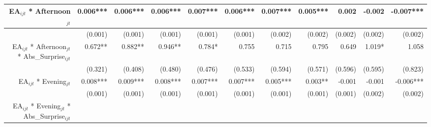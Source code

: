 \begin{table}
{\begin{tabular}{rrrrrrrrrrr}
\multicolumn{1}{|r|}{EA$_{ijt}$ * Afternoon$_{jt}$} &
  \multicolumn{1}{r|}{0.006***} &
  \multicolumn{1}{r|}{0.006***} &
  \multicolumn{1}{r|}{0.006***} &
  \multicolumn{1}{r|}{0.007***} &
  \multicolumn{1}{r|}{0.006***} &
  \multicolumn{1}{r|}{0.007***} &
  \multicolumn{1}{r|}{0.005***} &
  \multicolumn{1}{r|}{0.002} &
  \multicolumn{1}{r|}{-0.002} &
  \multicolumn{1}{r|}{-0.007***} \\ \hline
\multicolumn{1}{|r|}{} &
  \multicolumn{1}{r|}{(0.001)} &
  \multicolumn{1}{r|}{(0.001)} &
  \multicolumn{1}{r|}{(0.001)} &
  \multicolumn{1}{r|}{(0.001)} &
  \multicolumn{1}{r|}{(0.001)} &
  \multicolumn{1}{r|}{(0.002)} &
  \multicolumn{1}{r|}{(0.002)} &
  \multicolumn{1}{r|}{(0.002)} &
  \multicolumn{1}{r|}{(0.002)} &
  \multicolumn{1}{r|}{(0.002)} \\ \hline
\multicolumn{1}{|r|}{EA$_{ijt}$ * Afternoon$_{jt}$ * Abs\_Surprise$_{ijt}$} &
  \multicolumn{1}{r|}{0.672**} &
  \multicolumn{1}{r|}{0.882**} &
  \multicolumn{1}{r|}{0.946**} &
  \multicolumn{1}{r|}{0.784*} &
  \multicolumn{1}{r|}{0.755} &
  \multicolumn{1}{r|}{0.715} &
  \multicolumn{1}{r|}{0.795} &
  \multicolumn{1}{r|}{0.649} &
  \multicolumn{1}{r|}{1.019*} &
  \multicolumn{1}{r|}{1.058} \\ \hline
\multicolumn{1}{|r|}{} &
  \multicolumn{1}{r|}{(0.321)} &
  \multicolumn{1}{r|}{(0.408)} &
  \multicolumn{1}{r|}{(0.480)} &
  \multicolumn{1}{r|}{(0.476)} &
  \multicolumn{1}{r|}{(0.533)} &
  \multicolumn{1}{r|}{(0.594)} &
  \multicolumn{1}{r|}{(0.571)} &
  \multicolumn{1}{r|}{(0.596)} &
  \multicolumn{1}{r|}{(0.595)} &
  \multicolumn{1}{r|}{(0.823)} \\ \hline
\multicolumn{1}{|r|}{EA$_{ijt}$ * Evening$_{jt}$} &
  \multicolumn{1}{r|}{0.008***} &
  \multicolumn{1}{r|}{0.009***} &
  \multicolumn{1}{r|}{0.008***} &
  \multicolumn{1}{r|}{0.007***} &
  \multicolumn{1}{r|}{0.007***} &
  \multicolumn{1}{r|}{0.005***} &
  \multicolumn{1}{r|}{0.003**} &
  \multicolumn{1}{r|}{-0.001} &
  \multicolumn{1}{r|}{-0.001} &
  \multicolumn{1}{r|}{-0.006***} \\ \hline
\multicolumn{1}{|r|}{} &
  \multicolumn{1}{r|}{(0.001)} &
  \multicolumn{1}{r|}{(0.001)} &
  \multicolumn{1}{r|}{(0.001)} &
  \multicolumn{1}{r|}{(0.001)} &
  \multicolumn{1}{r|}{(0.001)} &
  \multicolumn{1}{r|}{(0.001)} &
  \multicolumn{1}{r|}{(0.001)} &
  \multicolumn{1}{r|}{(0.001)} &
  \multicolumn{1}{r|}{(0.002)} &
  \multicolumn{1}{r|}{(0.002)} \\ \hline
\multicolumn{1}{|r|}{EA$_{ijt}$ * Evening$_{jt}$ * Abs\_Surprise$_{ijt}$} &

\end{tabular}}
\end{table}
